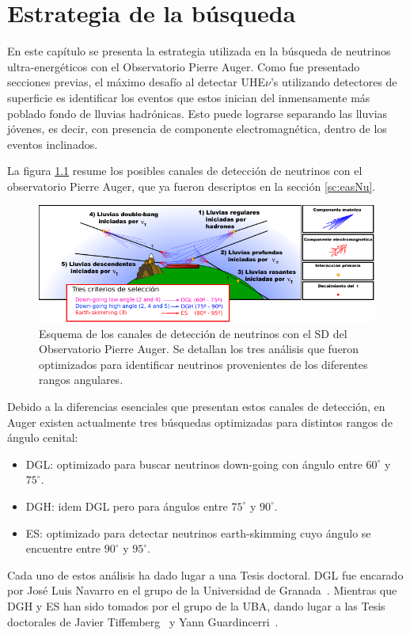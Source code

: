 \chapter{Estrategia de la búsqueda}
\label{ch:estrategiaAuger}

En este capítulo se presenta la estrategia utilizada en la búsqueda de neutrinos ultra-energéticos con el Observatorio Pierre Auger.
Como fue presentado secciones previas, el m\'aximo desafío al detectar UHE$\nu$'s utilizando detectores de superficie es identificar los eventos que estos inician del inmensamente más poblado fondo de lluvias hadrónicas.
Esto puede lograrse separando las lluvias jóvenes, es decir, con presencia de componente electromagn\'etica, dentro de los eventos inclinados.

La figura \ref{fig:augerNu} resume los posibles canales de detección de neutrinos con el observatorio Pierre Auger, que ya fueron descriptos en la sección \ref{sc:easNu}.
	\begin{figure}[ht!]
		\centering
		\includegraphics[width=\textwidth]{./fig/estrategiaAuger/auger_nu}
		\caption{\label{fig:augerNu}
		Esquema de los canales de detección de neutrinos con el SD del Observatorio Pierre Auger. Se detallan los tres análisis que fueron optimizados para identificar neutrinos provenientes de los diferentes rangos angulares.
		}
	\end{figure}
Debido a la diferencias esenciales que presentan estos canales de detección, en Auger existen actualmente tres búsquedas optimizadas para distintos rangos de ángulo cenital:
\begin{itemize}
 \item DGL: optimizado para buscar neutrinos down-going con ángulo entre $60^\circ$ y $75^\circ$.
 \item DGH: idem DGL pero para ángulos entre $75^\circ$ y $90^\circ$. 
 \item ES: optimizado para detectar neutrinos earth-skimming cuyo ángulo se encuentre entre $90^\circ$ y $95^\circ$.
\end{itemize}
%
Cada uno de estos an\'alisis ha dado lugar a una Tesis doctoral. DGL fue encarado por Jos\'e Luis Navarro en el grupo de la Universidad de Granada~\cite{cite:tesisNavarro}. Mientras que DGH y ES han sido tomados por el grupo de la UBA, dando lugar a las Tesis doctorales de Javier Tiffemberg~\cite{cite:tesisJavier} y Yann Guardincerri~\cite{cite:tesisYann}.

